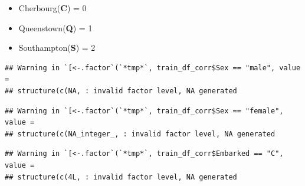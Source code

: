 \documentclass[]{article}
\newenvironment{Shaded}{\begin{snugshade}}{\end{snugshade}}
\newcommand{\CommentTok}[1]{\textcolor[rgb]{0.56,0.35,0.01}{\textit{#1}}}
\newcommand{\DecValTok}[1]{\textcolor[rgb]{0.00,0.00,0.81}{#1}}
\newcommand{\NormalTok}[1]{#1}
\newcommand{\OperatorTok}[1]{\textcolor[rgb]{0.81,0.36,0.00}{\textbf{#1}}}
\newcommand{\StringTok}[1]{\textcolor[rgb]{0.31,0.60,0.02}{#1}}
\providecommand{\tightlist}{%
  \setlength{\itemsep}{0pt}\setlength{\parskip}{0pt}}
\begin{document}
\begin{itemize}
\tightlist
\item
  Cherbourg(\textbf{C}) = 0
\item
  Queenstown(\textbf{Q}) = 1
\item
  Southampton(\textbf{S}) = 2
\end{itemize}

\begin{Shaded}
\end{Shaded}

\begin{verbatim}
## Warning in `[<-.factor`(`*tmp*`, train_df_corr$Sex == "male", value =
## structure(c(NA, : invalid factor level, NA generated
\end{verbatim}

\begin{Shaded}
\end{Shaded}

\begin{verbatim}
## Warning in `[<-.factor`(`*tmp*`, train_df_corr$Sex == "female", value =
## structure(c(NA_integer_, : invalid factor level, NA generated
\end{verbatim}

\begin{Shaded}
\end{Shaded}

\begin{verbatim}
## Warning in `[<-.factor`(`*tmp*`, train_df_corr$Embarked == "C", value =
## structure(c(4L, : invalid factor level, NA generated
\end{verbatim}
\end{document}
